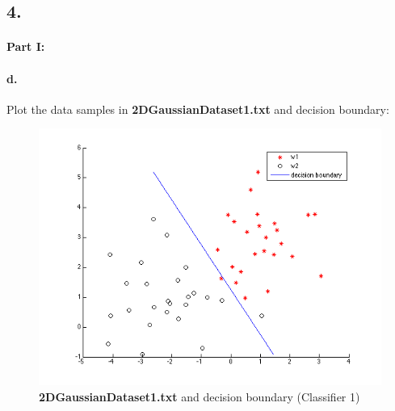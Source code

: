 \documentclass[a4paper]{article}
\begin{document}
\subsection*{4. }

\paragraph{Part I:}
\paragraph{d.} Plot the data samples in \textbf{2DGaussianDataset1.txt} and decision boundary: \\
\begin{figure}[H]
  \centering
    \includegraphics[scale=.6]{images/1_d.png}
  \caption{\textbf{2DGaussianDataset1.txt} and decision boundary (Classifier 1)}
\end{figure}
\end{document}

